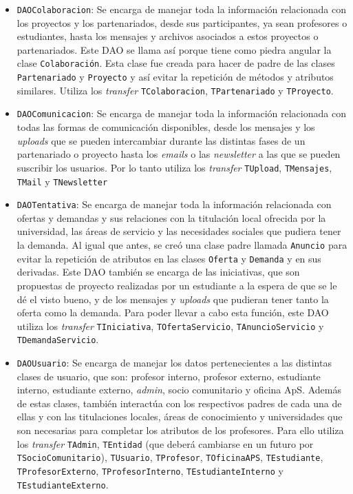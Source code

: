 \documentclass[11pt]{book}
\begin{document}
	\begin{itemize}
		\item \texttt{DAOColaboracion}: Se encarga de manejar toda la información relacionada con los proyectos y los partenariados, desde sus participantes, ya sean profesores o estudiantes, hasta los mensajes y archivos asociados a estos proyectos o partenariados. Este DAO se llama así porque tiene como piedra angular la clase \texttt{Colaboración}.
		Esta clase fue creada para hacer de padre de las clases \texttt{Partenariado} y \texttt{Proyecto} y así evitar la repetición de métodos y atributos similares. Utiliza los \emph{transfer} \texttt{TColaboracion}, \texttt{TPartenariado} y \texttt{TProyecto}.
		
		\item \texttt{DAOComunicacion}: Se encarga de manejar toda la información relacionada con todas las formas de comunicación disponibles, desde los mensajes y los \emph{uploads} que se pueden intercambiar durante las distintas fases de un partenariado o proyecto hasta los \emph{emails} o las \emph{newsletter} a las que se pueden suscribir los usuarios. Por lo tanto utiliza los \emph{transfer} \texttt{TUpload}, \texttt{TMensajes}, \texttt{TMail} y \texttt{TNewsletter}
		
		\item \texttt{DAOTentativa}: Se encarga de manejar toda la información relacionada con ofertas y demandas y sus relaciones con la titulación local ofrecida por la universidad, las áreas de servicio y las necesidades sociales que pudiera tener la demanda. 
		Al igual que antes, se creó una clase padre llamada \texttt{Anuncio} para evitar la repetición de atributos en las clases \texttt{Oferta} y \texttt{Demanda} y en sus derivadas. Este DAO también se encarga de las iniciativas, que son propuestas de proyecto realizadas por un estudiante a la espera de que se le dé el visto bueno, y de los mensajes y \emph{uploads} que pudieran tener tanto la oferta como la demanda. Para poder llevar a cabo esta función, este DAO utiliza los \emph{transfer} \texttt{TIniciativa}, \texttt{TOfertaServicio}, \texttt{TAnuncioServicio} y \texttt{TDemandaServicio}.
		
		\item \texttt{DAOUsuario}: Se encarga de manejar los datos pertenecientes a las distintas clases de usuario, que son: profesor interno, profesor externo, estudiante interno, estudiante externo, \emph{admin}, socio comunitario y oficina ApS.
		Además de estas clases, también interactúa con los respectivos padres de cada una de ellas y con las titulaciones locales, áreas de conocimiento y universidades que son necesarias para completar los atributos de los profesores.
		Para ello utiliza los \emph{transfer} \texttt{TAdmin}, \texttt{TEntidad} (que deberá cambiarse en un futuro por \texttt{TSocioComunitario}), \texttt{TUsuario}, \texttt{TProfesor}, \texttt{TOficinaAPS}, \texttt{TEstudiante}, \texttt{TProfesorExterno}, \texttt{TProfesorInterno}, \texttt{TEstudianteInterno} y \texttt{TEstudianteExterno}.
		
		
	\end{itemize}
\end{document}
